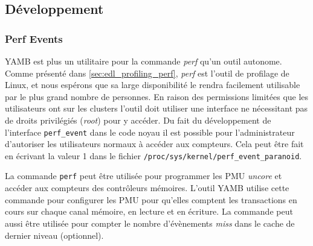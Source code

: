     

\subsection{Développement}


    \subsubsection{Perf Events}
    
     
        YAMB est plus un utilitaire pour la commande \textit{perf} qu'un outil autonome. Comme présenté dans \autoref{sec:edl_profiling_perf}, \textit{perf} est l'outil de profilage de Linux, et nous espérons que sa large disponibilité le rendra facilement utilisable par le plus grand nombre de personnes.  En raison des permissions limitées que les utilisateurs ont sur les clusters l'outil doit utiliser une interface ne nécessitant pas de droits privilégiés (\textit{root}) pour y accéder. Du fait du développement de l'interface \verb=perf_event= dans le code noyau il est possible pour l'administrateur d'autoriser les utilisateurs normaux à accéder aux compteurs. Cela peut être fait en écrivant la valeur 1 dans le fichier \verb=/proc/sys/kernel/perf_event_paranoid=.
        
        La commande \verb=perf= peut être utilisée pour programmer les PMU \textit{uncore} et accéder aux compteurs des contrôleurs mémoires. L'outil YAMB utilise cette commande pour configurer les PMU pour qu'elles comptent les transactions en cours sur chaque canal mémoire, en lecture et en écriture. La commande peut aussi être utilisée pour compter le nombre d'évènements \textit{miss} dans le cache de dernier niveau (optionnel).
        

